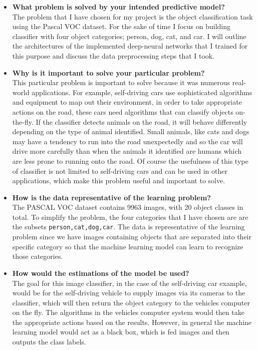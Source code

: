 \documentclass[10pt,a4paper]{article}
\begin{document}
\begin{itemize}
\item {\bf What problem is solved by your intended predictive model?}\\ 
The problem that I have chosen for my project is the object classification task using the Pascal VOC dataset. For the sake of time I focus on building classifier with four object categories; person, dog, cat, and car. I will outline the architectures of the implemented deep-neural networks that I trained for this purpose and discuss the data preprocessing steps that I took.

\item {\bf Why is it important to solve your particular problem?} \\
This particular problem is important to solve because it was numerous real-world applications. For example, self-driving cars use sophisticated algorithms and equipment to map out their environment, in order to take appropriate actions on the road, these cars need algorithms that can classify objects on-the-fly. If the classifier detects animals on the road, it will behave differently depending on the type of animal identified. Small animals, like cats and dogs may have a tendency to run into the road unexpectedly and so the car will drive more carefully than when the animals it identified are humans which are less prone to running onto the road. Of course the usefulness of this type of classifier is not limited to self-driving cars and can be used in other applications, which make this problem useful and important to solve.

\item {\bf How is the data representative of the learning problem?}\\
The PASCAL VOC dataset contains 9963 images, with 20 object classes in total. To simplify the problem, the four categories that I have chosen are are the subsets \lstinline{person,cat,dog,car}. The data is representative of the learning problem since we have images containing objects that are separated into their specific category so that the machine learning model can learn to recognize those categories. 

\item {\bf How would the estimations of the model be used?}\\
The goal for this image classifier, in the case of the self-driving car example, would be for the self-driving vehicle to supply images via its cameras to the classifier, which will then return the object category to the vehicles computer on the fly. The algorithms in the vehicles computer system would then take the appropriate actions based on the results. However, in general the machine learning model would act as a black box, which is fed images and then outputs the class labels. 
\end{itemize}
 
\end{document}
